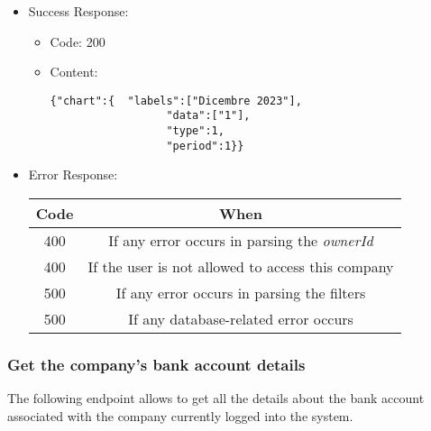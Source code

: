 \begin{itemize}
    \item Success Response: 
    \begin{itemize}
        \item Code: 200
        \item Content:
        \begin{lstlisting}
{"chart":{  "labels":["Dicembre 2023"],
                  "data":["1"],
                  "type":1,
                  "period":1}}
        \end{lstlisting}    
    \end{itemize}
    
    \item Error Response:
    \begin{table}[!h]
    \centering 
    \begin{tabular}{|c|c|}
    \hline
    \multicolumn{1}{|c|}{\textbf{Code}} & \multicolumn{1}{c|}{\textbf{When}} \\ \hline
    400 & If any error occurs in parsing the \textit{ownerId}  \\\hline
    400 & If the user is not allowed to access this company \\\hline
    500 & If any error occurs in parsing the filters \\\hline
    500 & If any database-related error occurs \\\hline
    \end{tabular} 
    \end{table} 
    
\end{itemize}


\newpage
\subsubsection*{Get the company's bank account details}

The following endpoint allows to get all the details about the bank account associated with the company currently logged into the system.

